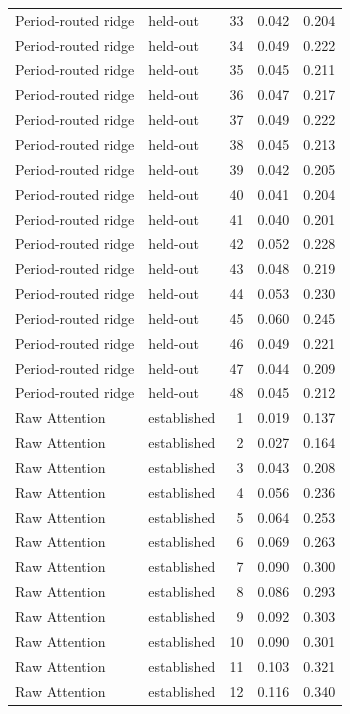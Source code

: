 \begin{tabular}{llrrr}
Period-routed ridge & held-out & 33 & 0.042 & 0.204 \\
Period-routed ridge & held-out & 34 & 0.049 & 0.222 \\
Period-routed ridge & held-out & 35 & 0.045 & 0.211 \\
Period-routed ridge & held-out & 36 & 0.047 & 0.217 \\
Period-routed ridge & held-out & 37 & 0.049 & 0.222 \\
Period-routed ridge & held-out & 38 & 0.045 & 0.213 \\
Period-routed ridge & held-out & 39 & 0.042 & 0.205 \\
Period-routed ridge & held-out & 40 & 0.041 & 0.204 \\
Period-routed ridge & held-out & 41 & 0.040 & 0.201 \\
Period-routed ridge & held-out & 42 & 0.052 & 0.228 \\
Period-routed ridge & held-out & 43 & 0.048 & 0.219 \\
Period-routed ridge & held-out & 44 & 0.053 & 0.230 \\
Period-routed ridge & held-out & 45 & 0.060 & 0.245 \\
Period-routed ridge & held-out & 46 & 0.049 & 0.221 \\
Period-routed ridge & held-out & 47 & 0.044 & 0.209 \\
Period-routed ridge & held-out & 48 & 0.045 & 0.212 \\
Raw Attention & established & 1 & 0.019 & 0.137 \\
Raw Attention & established & 2 & 0.027 & 0.164 \\
Raw Attention & established & 3 & 0.043 & 0.208 \\
Raw Attention & established & 4 & 0.056 & 0.236 \\
Raw Attention & established & 5 & 0.064 & 0.253 \\
Raw Attention & established & 6 & 0.069 & 0.263 \\
Raw Attention & established & 7 & 0.090 & 0.300 \\
Raw Attention & established & 8 & 0.086 & 0.293 \\
Raw Attention & established & 9 & 0.092 & 0.303 \\
Raw Attention & established & 10 & 0.090 & 0.301 \\
Raw Attention & established & 11 & 0.103 & 0.321 \\
Raw Attention & established & 12 & 0.116 & 0.340 \\

\end{tabular}
